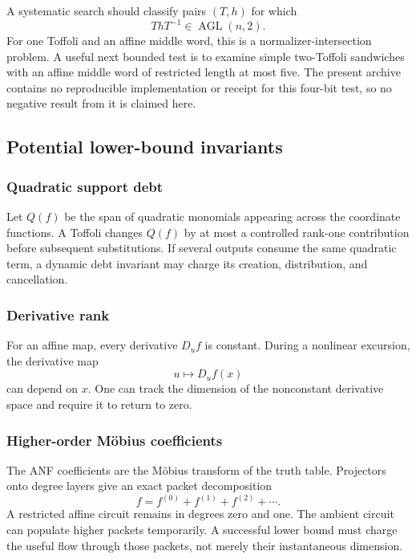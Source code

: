 A systematic search should classify pairs $(T,h)$ for which
\[
ThT^{-1}\in\operatorname{AGL}(n,2).
\]
For one Toffoli and an affine middle word, this is a normalizer-intersection problem.  A useful next bounded test is to examine simple two-Toffoli sandwiches with an affine middle word of restricted length at most five.  The present archive contains no reproducible implementation or receipt for this four-bit test, so no negative result from it is claimed here.

\subsection{Potential lower-bound invariants}
\subsubsection{Quadratic support debt}
Let $Q(f)$ be the span of quadratic monomials appearing across the coordinate functions.  A Toffoli changes $Q(f)$ by at most a controlled rank-one contribution before subsequent substitutions.  If several outputs consume the same quadratic term, a dynamic debt invariant may charge its creation, distribution, and cancellation.

\subsubsection{Derivative rank}
For an affine map, every derivative $D_u f$ is constant.  During a nonlinear excursion, the derivative map
\[
u\mapsto D_u f(x)
\]
can depend on $x$.  One can track the dimension of the nonconstant derivative space and require it to return to zero.

\subsubsection{Higher-order Möbius coefficients}
The ANF coefficients are the Möbius transform of the truth table.  Projectors onto degree layers give an exact packet decomposition
\[
f=f^{(0)}+f^{(1)}+f^{(2)}+\cdots.
\]
A restricted affine circuit remains in degrees zero and one.  The ambient circuit can populate higher packets temporarily.  A successful lower bound must charge the useful flow through those packets, not merely their instantaneous dimension.

